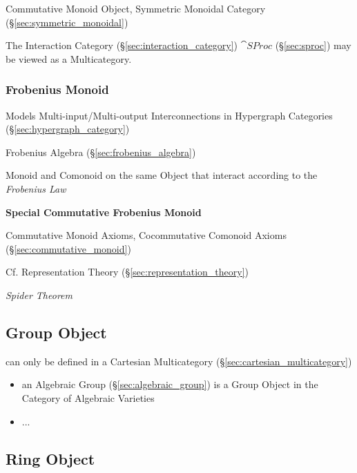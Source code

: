 Commutative Monoid Object, Symmetric Monoidal Category
(\S\ref{sec:symmetric_monoidal})

The Interaction Category (\S\ref{sec:interaction_category})
$\cat{SProc}$ (\S\ref{sec:sproc}) may be viewed as a Multicategory.



\subsubsection{Frobenius Monoid}\label{sec:frobenius_monoid}

Models Multi-input/Multi-output Interconnections in Hypergraph
Categories (\S\ref{sec:hypergraph_category})

\fist Frobenius Algebra (\S\ref{sec:frobenius_algebra})

Monoid and Comonoid on the same Object that interact according to the
\emph{Frobenius Law}


\textbf{Special Commutative Frobenius Monoid}

Commutative Monoid Axioms, Cocommutative Comonoid Axioms
(\S\ref{sec:commutative_monoid})

\fist Cf. Representation Theory (\S\ref{sec:representation_theory})

\emph{Spider Theorem}



\subsection{Group Object}\label{sec:group_object}

can only be defined in a Cartesian Multicategory
(\S\ref{sec:cartesian_multicategory})

\begin{itemize}
  \item an Algebraic Group (\S\ref{sec:algebraic_group}) is a Group Object in
    the Category of Algebraic Varieties
  \item ...
\end{itemize}



\subsection{Ring Object}\label{sec:ring_object}

